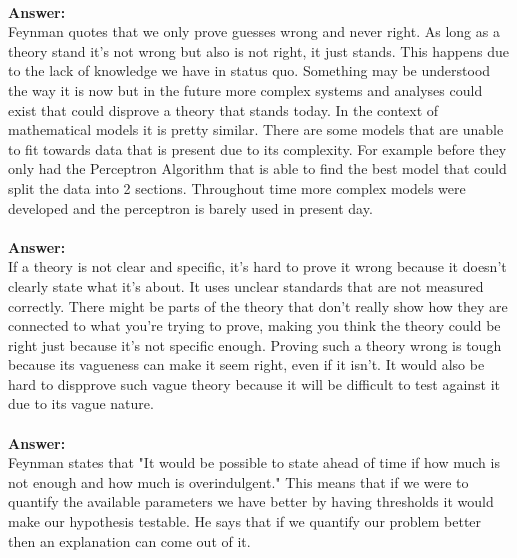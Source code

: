 \documentclass[12pt]{article}
\begin{document}
\begin{enumerate}
 \\ 
\textbf{Answer: } \\ 
Feynman quotes that we only prove guesses wrong and never right. As long as a theory stand it's not wrong but also is not right, it just stands. This happens due to the lack of knowledge we have in status quo. Something may be understood the way it is now but in the future more complex systems and analyses could exist that could disprove a theory that stands today. In the context of mathematical models it is pretty similar. There are some models that are unable to fit towards data that is present due to its complexity. For example before they only had the Perceptron Algorithm that is able to find the best model that could split the data into 2 sections. Throughout time more complex models were developed and the perceptron is barely used in present day. \\ 

 \\
\textbf{Answer: } \\
If a theory is not clear and specific, it's hard to prove it wrong because it doesn't clearly state what it's about. It uses unclear standards that are not measured correctly. There might be parts of the theory that don't really show how they are connected to what you're trying to prove, making you think the theory could be right just because it's not specific enough. Proving such a theory wrong is tough because its vagueness can make it seem right, even if it isn't. It would also be hard to dispprove such vague theory because it will be difficult to test against it due to its vague nature. \\

 \\
\textbf{Answer: } \\ 
Feynman states that "It would be possible to state ahead of time if how much is not enough and how much is overindulgent." This means that if we were to quantify the available parameters we have better by having thresholds it would make our hypothesis testable. He says that if we quantify our problem better then an explanation can come out of it. \\ 


\end{enumerate}
\end{document}
